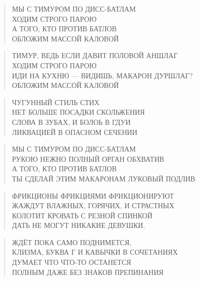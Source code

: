 \poemtitle{***}
\begin{verse}
МЫ С ТИМУРОМ ПО ДИСС-БАТЛАМ\\
ХОДИМ СТРОГО ПАРОЮ\\
А ТОГО, КТО ПРОТИВ БАТЛОВ\\
ОБЛОЖИМ МАССОЙ КАЛОВОЙ
\end{verse}

\poemtitle{***}
\begin{verse}
ТИМУР, ВЕДЬ ЕСЛИ ДАВИТ ПОЛОВОЙ АНШЛАГ\\
ХОДИМ СТРОГО ПАРОЮ\\
ИДИ НА КУХНЮ — ВИДИШЬ, МАКАРОН ДУРШЛАГ?\\
ОБЛОЖИМ МАССОЙ КАЛОВОЙ
\end{verse}

\poemtitle{***}
\begin{verse}
ЧУГУННЫЙ СТИЛЬ СТИХ\\
НЕТ БОЛЬШЕ ПОСАДКИ СКОЛЬЖЕНИЯ\\
СЛОВА В ЗУБАХ, И БОЛОЬ В ГДУИ\\
ЛИКВАЦИЕЙ В ОПАСНОМ СЕЧЕНИИ
\end{verse}

\poemtitle{***}
\begin{verse}
МЫ С ТИМУРОМ ПО ДИСС-БАТЛАМ\\
РУКОЮ НЕЖНО ПОЛНЫЙ ОРГАН ОБХВАТИВ\\
А ТОГО, КТО ПРОТИВ БАТЛОВ\\
ТЫ СДЕЛАЙ ЭТИМ МАКАРОНАМ ЛУКОВЫЙ ПОДЛИВ
\end{verse}

\poemtitle{***}
\begin{verse}
ФРИКЦИОНЫ ФРИКЦИЯМИ ФРИКЦИОНИРУЮТ\\
ЖАЖДУТ ВЛАЖНЫХ, ГОРЯЧИХ, И СТРАСТНЫХ\\
КОЛОТИТ КРОВАТЬ С РЕЗНОЙ СПИНКОЙ       \\
ДАТЬ НЕ МОГУТ НИКАКИЕ ДЕВУШКИ.
\end{verse}

\poemtitle{***}
\begin{verse}
ЖДЁТ ПОКА САМО ПОДНИМЕТСЯ,\\
КЛИЗМА, БУКВА Г И КАВЫЧКИ В СОЧЕТАНИЯХ\\
ДУМАЕТ ЧТО ЧТО-ТО ОСТАНЕТСЯ\\
ПОЛНЫМ ДАЖЕ БЕЗ ЗНАКОВ ПРЕПИНАНИЯ
\end{verse}

